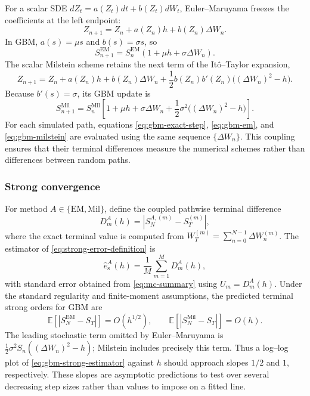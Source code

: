 For a scalar SDE $dZ_t=a(Z_t)dt+b(Z_t)dW_t$, Euler--Maruyama freezes the
coefficients at the left endpoint:
\begin{equation}
    Z_{n+1}=Z_n+a(Z_n)h+b(Z_n)\Delta W_n.
    \label{eq:general-em}
\end{equation}
In GBM, $a(s)=\mu s$ and $b(s)=\sigma s$, so
\begin{equation}
    S_{n+1}^{\mathrm{EM}}
    =S_n^{\mathrm{EM}}
       \left(1+\mu h+\sigma\Delta W_n\right).
    \label{eq:gbm-em}
\end{equation}
The scalar Milstein scheme retains the next term of the It\^o--Taylor
expansion,
\begin{equation}
    Z_{n+1}=Z_n+a(Z_n)h+b(Z_n)\Delta W_n
      +\frac12b(Z_n)b'(Z_n)\bigl((\Delta W_n)^2-h\bigr).
    \label{eq:general-milstein}
\end{equation}
Because $b'(s)=\sigma$, its GBM update is
\begin{equation}
    S_{n+1}^{\mathrm{Mil}}
    =S_n^{\mathrm{Mil}}\left[
       1+\mu h+\sigma\Delta W_n
       +\frac12\sigma^2\bigl((\Delta W_n)^2-h\bigr)
    \right].
    \label{eq:gbm-milstein}
\end{equation}
For each simulated path, equations \eqref{eq:gbm-exact-step},
\eqref{eq:gbm-em}, and \eqref{eq:gbm-milstein} are evaluated using the same
sequence $\{\Delta W_n\}$.  This coupling ensures that their terminal
differences measure the numerical schemes rather than differences between
random paths.

\subsubsection{Strong convergence}

For method $A\in\{\mathrm{EM},\mathrm{Mil}\}$, define the coupled pathwise
terminal difference
\[
    D_m^A(h)=\left|S_N^{A,(m)}-S_T^{(m)}\right|,
\]
where the exact terminal value is computed from
$W_T^{(m)}=\sum_{n=0}^{N-1}\Delta W_n^{(m)}$.  The estimator of
\eqref{eq:strong-error-definition} is
\begin{equation}
    \widehat e_{\mathrm{s}}^A(h)
       =\frac1M\sum_{m=1}^{M}D_m^A(h),
    \label{eq:gbm-strong-estimator}
\end{equation}
with standard error obtained from \eqref{eq:mc-summary} using
$U_m=D_m^A(h)$.  Under the standard regularity and finite-moment assumptions,
the predicted terminal strong orders for GBM are
\begin{equation}
    \mathbb{E}\!\left[|S_N^{\mathrm{EM}}-S_T|\right]=O(h^{1/2}),
    \qquad
    \mathbb{E}\!\left[|S_N^{\mathrm{Mil}}-S_T|\right]=O(h).
    \label{eq:gbm-strong-orders}
\end{equation}
The leading stochastic term omitted by Euler--Maruyama is
$\tfrac12\sigma^2S_n((\Delta W_n)^2-h)$; Milstein includes precisely this
term.  Thus a log--log plot of \eqref{eq:gbm-strong-estimator} against $h$
should approach slopes $1/2$ and $1$, respectively.  These slopes are
asymptotic predictions to test over several decreasing step sizes rather than
values to impose on a fitted line.

